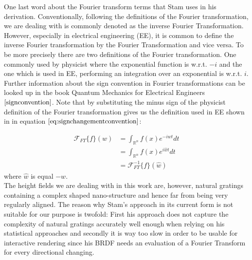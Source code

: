 \label{sec:electricalengeneeringftconvention}
\noindent
One last word about the Fourier transform terms that Stam uses in his derivation. Conventionally, following the definitions of the Fourier transformation, we are dealing with is commonly denoted as the inverse Fourier Transformation. However, especially in electrical engineering (EE), it is common to define the inverse Fourier transformation by the Fourier Transformation and vice versa. To be more precisely there are two definitions of the Fourier transformation. One commonly used by physicist where the exponential function is w.r.t. $-i$ and the one which is used in EE, performing an integration over an exponential is w.r.t. $i$. Further information about the sign convention in Fourier transformations can be looked up in the book Quantum Mechanics for Electrical Engineers$\cite{signconvention}$. Note that by substituting the minus sign of the physicist definition of the Fourier transformation gives us the definition used in EE shown in in equation $\ref{eq:signchangementconvention}$:

\begin{align}
\mathcal{F}_{FT}\{f\}(w) 
& = \int_{\mathds{R}^n} f(x)e^{-iwt} dt \nonumber\\
& = \int_{\mathds{R}^n} f(x)e^{i\hat{w}t} dt \nonumber\\
& = \mathcal{F}^{-1}_{FT}\{f\}(\hat{w})
\label{eq:signchangementconvention}
\end{align} 
where $\hat{w}$ is equal $-w$. \\

The height fields we are dealing with in this work are, however, natural gratings containing a complex shaped nano-structure and hence far from being very regularly aligned. The reason why Stam's approach in its current form is not suitable for our purpose is twofold: First his approach does not capture the complexity of natural gratings accurately well enough when relying on his statistical approaches and secondly it is way too slow in order to be usable for interactive rendering since his BRDF needs an evaluation of a Fourier Transform for every directional changing. \\